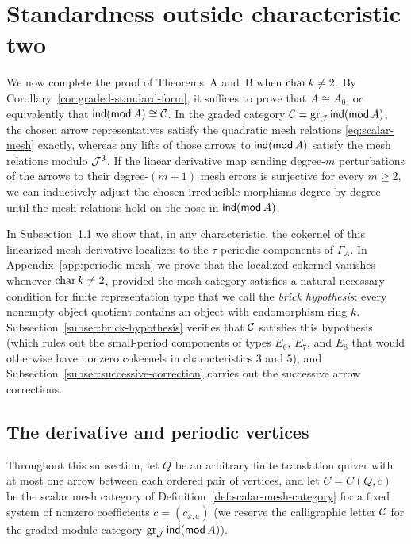 \section{Standardness outside characteristic two}
\label{sec:mesh-deformations}

We now complete the proof of Theorems~A and~B when $\operatorname{char} k\ne2$. By
Corollary~\ref{cor:graded-standard-form}, it suffices to prove that
$A\cong A_0$, or equivalently that $\operatorname{\mathsf{ind}}(\operatorname{\mathsf{mod}} A)\cong\mathcal C$. In the graded
category $\mathcal C=\operatorname{gr}_\mathcal J\operatorname{\mathsf{ind}}(\operatorname{\mathsf{mod}} A)$, the chosen arrow representatives satisfy
the quadratic mesh relations \eqref{eq:scalar-mesh} exactly, whereas any
lifts of those arrows to $\operatorname{\mathsf{ind}}(\operatorname{\mathsf{mod}} A)$ satisfy the mesh relations modulo
$\mathcal J^3$. If the linear derivative map sending degree-$m$ perturbations of the
arrows to their degree-$(m+1)$ mesh errors is surjective for every $m\geq2$,
we can inductively adjust the chosen irreducible morphisms degree by degree
until the mesh relations hold on the nose in $\operatorname{\mathsf{ind}}(\operatorname{\mathsf{mod}} A)$.

In Subsection~\ref{subsec:mesh-derivative} we show that, in any
characteristic, the cokernel of this linearized mesh derivative localizes to
the $\tau$-periodic components of $\Gamma_A$. In
Appendix~\ref{app:periodic-mesh} we prove that the localized cokernel
vanishes whenever $\operatorname{char} k\ne2$, provided the mesh category satisfies a
natural necessary condition for finite representation type that we call the
\emph{brick hypothesis}: every nonempty object quotient contains an object
with endomorphism ring $k$. Subsection~\ref{subsec:brick-hypothesis} verifies
that $\mathcal C$ satisfies this hypothesis (which rules out the small-period
components of types $E_6$, $E_7$, and $E_8$ that would otherwise have nonzero
cokernels in characteristics $3$ and $5$), and
Subsection~\ref{subsec:successive-correction} carries out the successive
arrow corrections.

\subsection{The derivative and periodic vertices}
\label{subsec:mesh-derivative}

Throughout this subsection, let $Q$ be an arbitrary finite translation quiver
with at most one arrow between each ordered pair of vertices, and let
$C=C(Q,c)$ be the scalar mesh category of
Definition~\ref{def:scalar-mesh-category} for a fixed system of nonzero
coefficients $c=(c_{x,a})$ (we reserve the calligraphic letter $\mathcal C$ for the
graded module category $\operatorname{gr}_\mathcal J\operatorname{\mathsf{ind}}(\operatorname{\mathsf{mod}} A)$).

